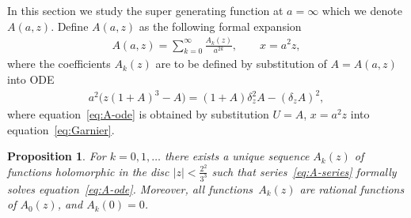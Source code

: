 \documentclass[pdftex]{sigma}
\numberwithin{equation}{section}
\newtheorem{Proposition}[Theorem]{Proposition}
 { \theoremstyle{definition}
\newtheorem{Remark}[Theorem]{Remark} }
\begin{document}
In this section we study the super generating function at $a=\infty$ which we denote $A(a,z)$.
Define $A(a,z)$ as the following formal expansion
\begin{gather}\label{eq:A-series}
A(a,z)=\sum\limits_{k=0}^{\infty}\frac{A_k(z)}{a^{2k}},
\qquad
x=a^2z,
\end{gather}
where the coefficients $A_k(z)$ are to be defined by substitution of $A=A(a,z)$ into ODE
\begin{gather}\label{eq:A-ode}
a^2\big(z(1+A)^3-A\big)=(1+A)\delta^2_zA-(\delta_zA)^2,
\end{gather}
where equation~\eqref{eq:A-ode} is obtained by substitution $U=A$, $x=a^2z$ into equation~\eqref{eq:Garnier}.
\begin{Proposition}\label{prop:Ak-formal}
For $k=0,1,\ldots$ there exists a unique sequence $A_k(z)$ of functions holomorphic in the disc $|z|<\frac{2^2}{3^3}$
such that series~\eqref{eq:A-series} formally solves equation~\eqref{eq:A-ode}. Moreover, all func\-tions~$A_k(z)$ are rational functions of $A_0(z)$, and $A_k(0)=0$.
\end{Proposition}
\end{document}
